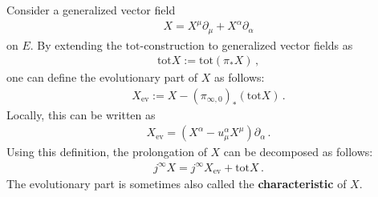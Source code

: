     \begin{property}
        Consider a generalized vector field
        \begin{gather}
            X = X^\mu\partial_\mu + X^\alpha\partial_\alpha
        \end{gather}
        on $E$. By extending the $\mathrm{tot}$-construction to generalized vector fields as
        \begin{gather}
            \mathrm{tot}X:=\mathrm{tot}(\pi_*X)\,,
        \end{gather}
        one can define the evolutionary part of $X$ as follows:
        \begin{gather}
            X_\mathrm{ev}:=X-(\pi_{\infty,0})_*(\mathrm{tot}X)\,.
        \end{gather}
        Locally, this can be written as
        \begin{gather}
            X_\mathrm{ev} = \left(X^\alpha - u^\alpha_\mu X^\mu\right)\partial_\alpha\,.
        \end{gather}
        Using this definition, the prolongation of $X$ can be decomposed as follows:
        \begin{gather}
            j^\infty X = j ^\infty X_\mathrm{ev} + \mathrm{tot}X\,.
        \end{gather}
        The evolutionary part is sometimes also called the \textbf{characteristic} of $X$.
    \end{property}

